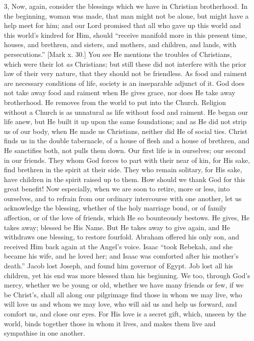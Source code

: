 3, Now, again, consider the blessings which we have in Christian
brotherhood. In the beginning, woman was made, that man might not be
alone, but might have a help meet for him; and our Lord promised that
all who gave up this world and this world's kindred for Him, should
``receive manifold more in this present time, houses, and
brethren, and sisters, and mothers, and children, and lands, with
persecutions.'' [Mark x. 30.] You see He mentions the troubles of
Christians, which were their lot \emph{as} Christians; but still these
did not interfere with the prior law of their very nature, that they
should not be friendless. As food and raiment are necessary conditions
of life, society is an inseparable adjunct of it. God does not take
away food and raiment when He gives grace, nor does He take away
brotherhood. He removes from the world to put into the Church.
Religion without a Church is as unnatural as life without food and
raiment. He began our life anew, but He built it up upon the same
foundations; and as He did not strip us of our body, when He made us
Christians, neither did He of social ties. Christ finds us in the
double tabernacle, of a house of flesh and a house of brethren, and He
sanctifies both, not pulls them down. Our first life is in ourselves;
our second in our friends. They whom God forces to part with their
near of kin, for His sake, find brethren in the spirit at their side.
They who remain solitary, for His sake, have children in the spirit
raised up to them. How should we thank God for this great benefit! Now
especially, when we are soon to retire, more or less, into ourselves,
and to refrain from our ordinary intercourse with one another, let us
acknowledge the blessing, whether of the holy marriage bond, or of
family affection, or of the love of friends, which He so bounteously
bestows. He gives, He takes away; blessed be His Name. But He takes
away to give again, and He withdraws one blessing, to restore
fourfold. Abraham offered his only son, and received Him back again at
the Angel's voice. Isaac ``took Rebekah, and she became his wife,
and he loved her; and Isaac was comforted after his mother's
death.'' Jacob lost Joseph, and found him governor of Egypt. Job
lost all his children, yet his end was more blessed than his
beginning. We too, through God's mercy, whether we be young or old,
whether we have many friends or few, if we be Christ's, shall all
along our pilgrimage find those in whom we may live, who will love us
and whom we may love, who will aid us and help us forward, and comfort
us, and close our eyes. For His love is a secret gift, which, unseen
by the world, binds together those in whom it lives, and makes them
live and sympathise in one another.

